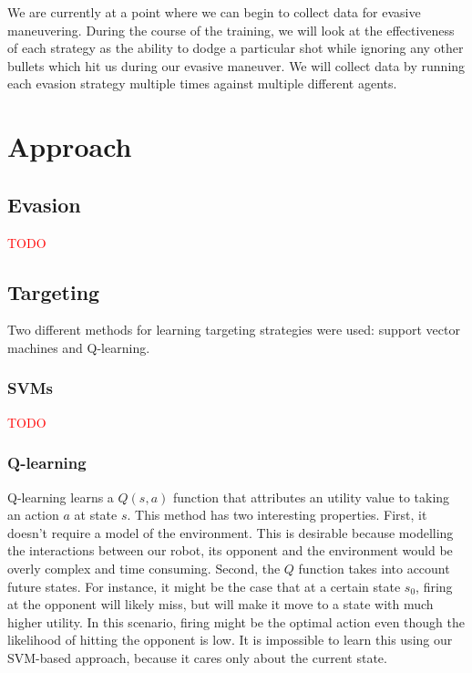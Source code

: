 \documentclass{article}
\newcommand{\xxx}[1]{\textcolor{red}{#1}}
\theoremstyle{plain}
\theoremstyle{definition}
\theoremstyle{remark}
\begin{document}
We are currently at a point where we can begin to collect data for evasive maneuvering. During the course of the training, we will look at the effectiveness of each strategy as the ability to dodge a particular shot while ignoring any other bullets which hit us during our evasive maneuver. We will collect data by running each evasion strategy multiple times against multiple different agents. 

\section{Approach}

\subsection{Evasion}

\xxx{TODO}

\subsection{Targeting}

Two different methods for learning targeting strategies were used: support vector machines and Q-learning.

\subsubsection{SVMs}

\xxx{TODO}

\subsubsection{Q-learning}
Q-learning \cite{watkins92a} learns a $Q(s, a)$ function that attributes an utility value to taking an action $a$ at state $s$. This method
has two interesting properties. First, it doesn't require a model of the environment. This is desirable because modelling the
interactions between our robot, its opponent and the environment would be overly complex and time consuming. Second, the $Q$ function
takes into account future states. For instance, it might be the case that
at a certain state $s_0$, firing at the opponent will likely miss, but will make it move to a state with much higher utility. In this scenario,
firing might be the optimal action even though the likelihood of hitting the opponent is low. It is impossible to learn this using our
SVM-based approach, because it cares only about the current state.
\end{document}
